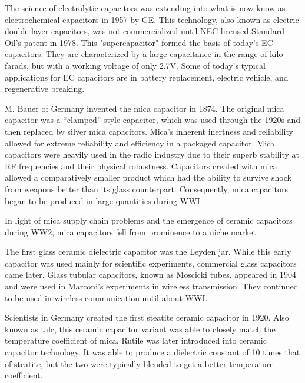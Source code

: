 The science of electrolytic capacitors was extending into what is now know as electrochemical capacitors in 1957 by GE. This technology, also known as electric double layer capacitors, was not commercialized until NEC licensed Standard Oil's patent in 1978.\cite{electrochem_intro} This "supercapacitor" formed the basis of today's EC capacitors. They are characterized by a large capacitance in the range of kilo farads, but with a working voltage of only 2.7V.\cite{electrochem_intro} Some of today's typical applications for EC capacitors are in battery replacement, electric vehicle, and regenerative breaking.

\nocite{hh}
\nocite{capGuide_mica}
M. Bauer of Germany invented the mica capacitor in 1874. The original mica capacitor was a ``clamped'' style capacitor, which was used through the 1920s\cite{wiki_mica} and then replaced by silver mica capacitors.\cite{learn_caps}
Mica's inherent inertness and reliability allowed for extreme reliability and efficiency in a packaged capacitor.\cite{tedds_mica} Mica capacitors were heavily used in the radio industry due to their superb stability at RF frequencies and their physical robustness.\cite{radio_mica}
Capacitors created with mica allowed a comparatively smaller product\cite[f.~37-41]{dumInv} which had the ability to survive shock from weapons better than its glass counterpart. Consequently, mica capacitors began to be produced in large quantities during WWI.

In light of mica supply chain problems and the emergence of ceramic capacitors during WW2, mica capacitors fell from prominence to a niche market.\cite[Ch 3, Sec II]{cerMaterials}

The first glass ceramic dielectric capacitor was the Leyden jar. While this early capacitor was used mainly for scientific experiments, commercial glass capacitors came later. 
Glass tubular capacitors, known as Moscicki tubes, appeared in 1904 and were used in Marconi's experiments in wireless transmission. They continued to be used in wireless communication until about WWI.\cite[p.~102]{dumInv}

Scientists in Germany created the first steatite ceramic capacitor in 1920.\cite[Ch 3 Sec II]{cerMaterials}\cite{cerDie} Also known as talc, this ceramic capacitor variant was able to closely match the temperature coefficient of mica.\cite{steatite_hf} Rutile was later introduced into ceramic capacitor technology. It was able to produce a dielectric constant of 10 times that of steatite, but the two were typically blended to get a better temperature coefficient. 

